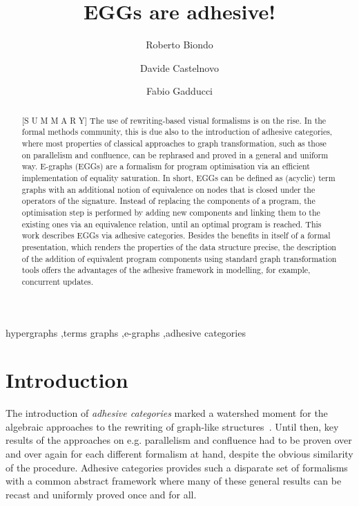\documentclass[a4paper,UKenglish,cleveref,pdftex,amsthm,thm-restate,numberwithinsect]{cas-sc}
\title[mode=title]{EGGs are adhesive!}
\author[1]{Roberto Biondo}[type=editor]
\affiliation[1]{organization={Department of Computer Science, University of Pisa},
	city={Pisa},
	postcode={56127},
	country={Italy}}
\author[1]{Davide Castelnovo}[type=editor,orcid=0000-0002-5926-5615]
\author[1]{Fabio Gadducci}[type=editor,orcid=0000-0003-0690-3051]
\theoremstyle{plain}
\theoremstyle{definition}
\begin{document}

\begin{abstract}[S U M M A R Y]
The use of rewriting-based visual formalisms is on the rise. 
%
In the formal methods community, this is due also to the introduction of adhesive
categories, where most properties of classical approaches to graph transformation, 
such as those on parallelism and confluence, can be rephrased and proved in a general and 
uniform way.
%
E-graphs (EGGs) are a formalism for program optimisation 
via an efficient implementation of equality saturation. 
In short, EGGs can be  defined as (acyclic) term graphs with an additional notion of 
equivalence on nodes that is closed under the operators of the signature.
Instead of replacing the components of a program, the optimisation step 
is performed by adding new components and linking them to 
the existing ones via an equivalence relation, until an optimal program is reached.
%
This work describes EGGs via adhesive categories. 
Besides the benefits in itself of a formal presentation, which renders the 
properties of the data structure precise, the description of the addition of equivalent 
program components using standard graph transformation tools offers the advantages 
of the adhesive framework in modelling, for example, concurrent updates.
%
\end{abstract}

\begin{keywords}
hypergraphs \sep terms graphs \sep e-graphs \sep adhesive categories
\end{keywords}

\maketitle

\section{Introduction}
The introduction of \emph{adhesive categories} marked a watershed moment for the algebraic approaches 
to the rewriting of graph-like structures~\cite{lack2005adhesive,ehrig2006fundamentals}.
%
Until then, key results of the approaches on e.g. parallelism and confluence had to be proven 
over and over again for each different formalism at hand, %
despite the obvious similarity of the procedure.
%
Adhesive categories provides such a disparate set of formalisms with a common abstract framework 
where many of these general results can be recast and uniformly proved once and for all.
 
\end{document}
